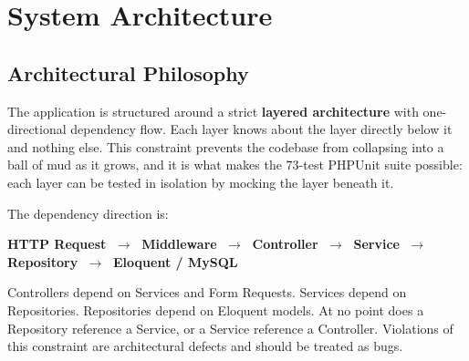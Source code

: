 \chapter{System Architecture}
\label{chap:architecture}


\section{Architectural Philosophy}
\label{sec:arch-philosophy}

The application is structured around a strict \textbf{layered architecture}
with one-directional dependency flow. Each layer knows about the layer
directly below it and nothing else. This constraint prevents the codebase
from collapsing into a ball of mud as it grows, and it is what makes the
73-test PHPUnit suite possible: each layer can be tested in isolation by
mocking the layer beneath it.

The dependency direction is:

\begin{center}
  \large
  \textbf{HTTP Request}
  $\;\longrightarrow\;$
  \textbf{Middleware}
  $\;\longrightarrow\;$
  \textbf{Controller}
  $\;\longrightarrow\;$
  \textbf{Service}
  $\;\longrightarrow\;$
  \textbf{Repository}
  $\;\longrightarrow\;$
  \textbf{Eloquent / MySQL}
\end{center}

\vspace{6pt}

Controllers depend on Services and Form Requests. Services depend on
Repositories. Repositories depend on Eloquent models. At no point does
a Repository reference a Service, or a Service reference a Controller.
Violations of this constraint are architectural defects and should be
treated as bugs.


